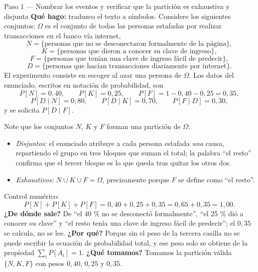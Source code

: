 \documentclass[11pt]{article}
\begin{document}
\begin{sol}

\begin{paso}{Paso 1 --- Nombrar los eventos y verificar que la partici\'on es exhaustiva y disjunta}
\textbf{Qu\'e hago:} traduzco el texto a s\'imbolos. Considere los siguientes conjuntos: $\Omega$ es el conjunto de todas las personas estafadas por realizar transacciones en el banco v\'ia internet,
\[
N=\{\text{personas que no se desconectaron formalmente de la p\'agina}\},
\]
\[
K=\{\text{personas que dieron a conocer su clave de ingreso}\},
\]
\[
F=\{\text{personas que ten\'ian una clave de ingreso f\'acil de predecir}\},
\]
\[
D=\{\text{personas que hac\'ian transacciones diariamente por internet}\}.
\]
El experimento consiste en escoger al azar una persona de $\Omega$.
Los datos del enunciado, escritos en notaci\'on de probabilidad, son
\[
P[N]=0{,}40,\qquad P[K]=0{,}25,\qquad P[F]=1-0{,}40-0{,}25=0{,}35 ,
\]
\[
P[D\mid N]=0{,}80,\qquad P[D\mid K]=0{,}70,\qquad P[F\mid D]=0{,}30 ,
\]
y se solicita $P[D\mid F]$.

\medskip
Note que los conjuntos $N$, $K$ y $F$ forman una partici\'on de $\Omega$:
\begin{itemize}[leftmargin=1.4em]
\item \emph{Disjuntos:} el enunciado atribuye a cada persona estafada \emph{una} causa, repartiendo el grupo en tres bloques que suman el total; la palabra ``el resto'' confirma que el tercer bloque es lo que queda tras quitar los otros dos.
\item \emph{Exhaustivos:} $N\cup K\cup F=\Omega$, precisamente porque $F$ se define como ``el resto''.
\end{itemize}
Control num\'erico:
\[
P[N]+P[K]+P[F]=0{,}40+0{,}25+0{,}35=0{,}65+0{,}35=1{,}00 .
\]
\textbf{¿De d\'onde sale?} De ``el 40 \% no se desconect\'o formalmente'', ``el 25 \% di\'o a conocer su clave'' y ``el resto ten\'ia una clave de ingreso f\'acil de predecir''; el $0{,}35$ se calcula, no se lee.
\textbf{¿Por qu\'e?} Porque sin el peso de la tercera casilla no se puede escribir la ecuaci\'on de probabilidad total, y ese peso solo se obtiene de la propiedad $\sum_i P[A_i]=1$.
\textbf{¿Qu\'e tomamos?} Tomamos la partici\'on v\'alida $\{N,K,F\}$ con pesos $0{,}40$, $0{,}25$ y $0{,}35$.
\end{paso}


\end{sol}
\end{document}
